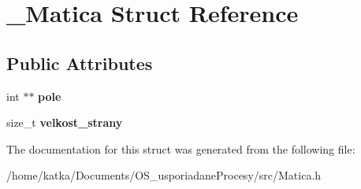 \hypertarget{struct__Matica}{}\section{\+\_\+\+Matica Struct Reference}
\label{struct__Matica}
\subsection*{Public Attributes}
\begin{DoxyCompactItemize}
\item 
int $\ast$$\ast$ {\bfseries pole}\hypertarget{struct__Matica_ac3fca0017962cbf096d0e50b54c640b0}{}\label{struct__Matica_ac3fca0017962cbf096d0e50b54c640b0}

\item 
size\+\_\+t {\bfseries velkost\+\_\+strany}\hypertarget{struct__Matica_a089eec293e9332883a0a8963043ae869}{}\label{struct__Matica_a089eec293e9332883a0a8963043ae869}

\end{DoxyCompactItemize}


The documentation for this struct was generated from the following file\+:\begin{DoxyCompactItemize}
\item 
/home/katka/\+Documents/\+O\+S\+\_\+usporiadane\+Procesy/src/Matica.\+h\end{DoxyCompactItemize}
